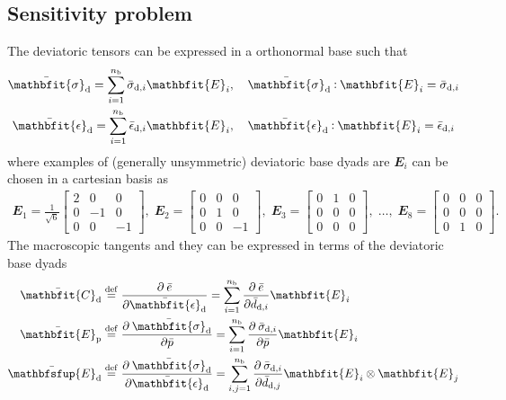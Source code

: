 \documentclass[12pt,a4paper]{article}
\renewcommand{\ts}[1]{\mathbfit{#1}}
\renewcommand{\tf}[1]{\mathbfsfup{#1}}
\renewcommand{\dev}{\mathrm{d}}
\newcommand{\ded}{\mathrm{d}}
\newcommand{\dep}{\mathrm{p}}
\begin{document}
\subsection{Sensitivity problem}
\label{appendix:sensitivity}

The deviatoric tensors can be expressed in a orthonormal base such that
\begin{subequations}
\begin{gather}
 \bar{\ts\sigma}_\dev = \sum_{i=1}^{n_{\mathrm{b}}} \bar{\sigma}_{\dev,i} \ts E_i,\quad \bar{\ts\sigma}_\dev \dprod \ts E_i = \bar{\sigma}_{\dev,i}
\label{eq:sigma_base} \\
 \bar{\ts\epsilon}_\dev = \sum_{i=1}^{n_{\mathrm{b}}} \bar{\epsilon}_{\dev,i} \ts E_i,\quad \bar{\ts\epsilon}_\dev \dprod \ts E_i = \bar{\epsilon}_{\dev,i}
\label{eq:d_base}
\end{gather}
\end{subequations}
where examples of (generally unsymmetric) deviatoric base dyads are $\ts E_i$ can be chosen in a cartesian basis as
\begin{equation}
\begin{gathered}
 \ts E_1 = \frac{1}{\sqrt{6}}\left[\begin{smallmatrix} 2 & 0 & 0\\ 0 & -1 & 0\\ 0 & 0 & -1\end{smallmatrix}\right],\;
 \ts E_2 = \left[\begin{smallmatrix} 0 & 0 & 0\\ 0 & 1 & 0 \\ 0 & 0 & -1\end{smallmatrix}\right],\;
 \ts E_3 = \left[\begin{smallmatrix} 0 & 1 & 0\\ 0 & 0 & 0 \\ 0 & 0 & 0\end{smallmatrix}\right],\;
 \ldots,\;
 \ts E_8 = \left[\begin{smallmatrix} 0 & 0 & 0\\ 0 & 0 & 0 \\ 0 & 1 & 0\end{smallmatrix}\right].
\end{gathered}
\end{equation}
The macroscopic tangents and they can be expressed in terms of the deviatoric base dyads
\begin{align}
 \bar{\ts C}_\ded \defeq \;&\pd{\bar{e}}{\bar{\ts\epsilon}_\dev} = \sum_{i=1}^{n_\mathrm{b}} \pd{\bar{e}}{\bar{d}_{\dev,i}} \ts E_i\\
 \bar{\ts E}_\dep \defeq \;&\pd{\bar{\ts\sigma}_\dev}{\bar{p}} = \sum_{i=1}^{n_\mathrm{b}} \pd{\bar{\sigma}_{\dev,i}}{\bar{p}} \ts E_i\\
 \bar{\tf E}_\ded \defeq \;&\pd{\bar{\ts\sigma}_\dev}{\bar{\ts\epsilon}_\dev} =  \sum_{i,j=1}^{n_\mathrm{b}} \pd{\bar{\sigma}_{\dev,i}}{\bar{d}_{\dev,j}} \ts E_i \outerp \ts E_j
\end{align}
\end{document}
